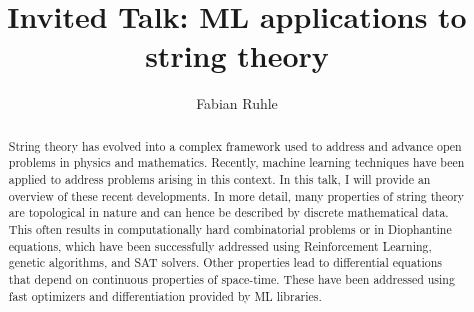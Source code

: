 \documentclass[a4paper]{easychair}%
\title{Invited Talk: ML applications to string theory}
\author{Fabian Ruhle}
\institute{CERN}
\begin{document}
\maketitle
\begin{abstract}
String theory has evolved into a complex framework used to address and advance open problems in physics and mathematics. Recently, machine learning techniques have been applied to address problems arising in this context. In this talk, I will provide an overview of these recent developments. In more detail, many properties of string theory are topological in nature and can hence be described by discrete mathematical data. This often results in computationally hard combinatorial problems or in Diophantine equations, which have been successfully addressed using Reinforcement Learning, genetic algorithms, and SAT solvers.
Other properties lead to differential equations that depend on continuous properties of space-time. These have been addressed using fast optimizers and differentiation provided by ML libraries.


\end{abstract}
\end{document}
